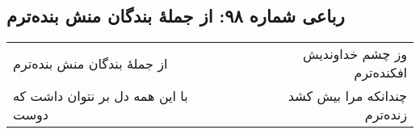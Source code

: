 \begin{center}
\section*{رباعی شماره ۹۸: از جملهٔ بندگان منش بنده‌ترم}
\label{sec:098}
\begin{longtable}{l p{0.5cm} r}
از جملهٔ بندگان منش بنده‌ترم
&&
وز چشم خداوندیش افکنده‌ترم
\\
با این همه دل بر نتوان داشت که دوست
&&
چندانکه مرا بیش کشد زنده‌ترم
\\
\end{longtable}
\end{center}
